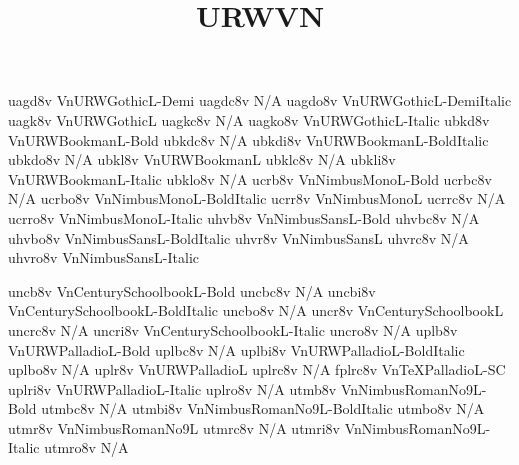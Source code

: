 \documentclass[test]{vnsample}
\title{URWVN}
\begin{document}
\begin{shortsample}
  {uagd8v}  {VnURWGothicL-Demi}
 {uagdc8v} {N/A}
 {uagdo8v} {VnURWGothicL-DemiItalic}
   {uagk8v}  {VnURWGothicL}
  {uagkc8v} {N/A}
  {uagko8v} {VnURWGothicL-Italic}
%
  {ubkd8v}  {VnURWBookmanL-Bold}
 {ubkdc8v} {N/A}
 {ubkdi8v} {VnURWBookmanL-BoldItalic}
 {ubkdo8v} {N/A}
   {ubkl8v}  {VnURWBookmanL}
  {ubklc8v} {N/A}
  {ubkli8v} {VnURWBookmanL-Italic}
  {ubklo8v} {N/A}
%
   {ucrb8v}  {VnNimbusMonoL-Bold}
  {ucrbc8v} {N/A}
  {ucrbo8v} {VnNimbusMonoL-BoldItalic}
   {ucrr8v}  {VnNimbusMonoL}
  {ucrrc8v} {N/A}
  {ucrro8v} {VnNimbusMonoL-Italic}
%
   {uhvb8v}  {VnNimbusSansL-Bold}
  {uhvbc8v} {N/A}
  {uhvbo8v} {VnNimbusSansL-BoldItalic}
   {uhvr8v}  {VnNimbusSansL}
  {uhvrc8v} {N/A}
  {uhvro8v} {VnNimbusSansL-Italic}
\end{shortsample}
\clearpage
\begin{shortsample}
   {uncb8v}  {VnCenturySchoolbookL-Bold}
  {uncbc8v} {N/A}
  {uncbi8v} {VnCenturySchoolbookL-BoldItalic}
  {uncbo8v} {N/A}
   {uncr8v}  {VnCenturySchoolbookL}
  {uncrc8v} {N/A}
  {uncri8v} {VnCenturySchoolbookL-Italic}
  {uncro8v} {N/A}
%
   {uplb8v}  {VnURWPalladioL-Bold}
  {uplbc8v} {N/A}
  {uplbi8v} {VnURWPalladioL-BoldItalic}
  {uplbo8v} {N/A}
   {uplr8v}  {VnURWPalladioL}
  {uplrc8v} {N/A}
  {fplrc8v} {VnTeXPalladioL-SC}
  {uplri8v} {VnURWPalladioL-Italic}
  {uplro8v} {N/A}
%
   {utmb8v}  {VnNimbusRomanNo9L-Bold}
  {utmbc8v} {N/A}
  {utmbi8v} {VnNimbusRomanNo9L-BoldItalic}
  {utmbo8v} {N/A}
   {utmr8v}  {VnNimbusRomanNo9L}
  {utmrc8v} {N/A}
  {utmri8v} {VnNimbusRomanNo9L-Italic}
  {utmro8v} {N/A}
\end{shortsample}
\end{document}
